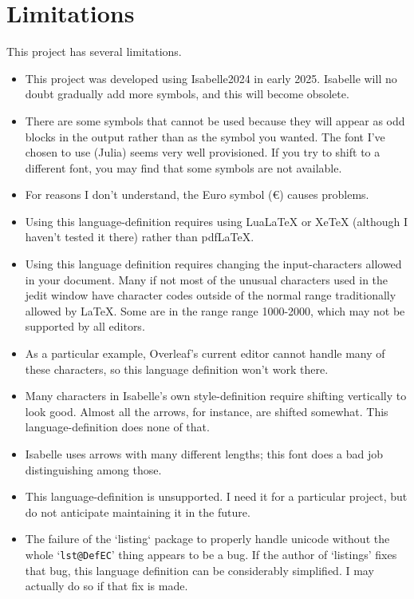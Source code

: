 \documentclass[11pt,notitlepage,openany,oneside]{book}
\begin{document}
\section{Limitations}
This project has several limitations.
\begin{itemize}
    
\item  This project was developed using Isabelle2024 in early 2025. Isabelle 
 will no doubt gradually add more symbols, and this will become obsolete. 

\item There are some symbols that cannot be used because they will appear as 
odd blocks in the output rather than as the symbol you wanted. The font I've 
chosen to use (Julia) seems very well provisioned. If you try to shift to 
a different font, you may find that some symbols are not available. 

\item For reasons I don't understand, the Euro symbol (€) causes problems.

\item Using this language-definition requires using LuaLaTeX or XeTeX (although 
I haven't tested it there) rather than pdfLaTeX.

\item Using this language definition requires changing the input-characters 
allowed in your document. Many if not most of the unusual characters used in the jedit 
window have character codes outside of the normal range traditionally allowed by LaTeX. Some
are in the range range 1000-2000, which may not be supported by all editors.

\item As a particular example, Overleaf's current editor cannot handle many 
of these characters, so this language definition won't work there.

\item Many characters in Isabelle's own style-definition require shifting 
vertically to look good. Almost all the arrows, for instance, are shifted 
somewhat. This language-definition does none of that.

\item Isabelle uses arrows with many different lengths; this font does a 
bad job distinguishing among those. 

\item This language-definition is unsupported. I need it for a particular
project, but do not anticipate maintaining it in the future.

\item The failure of the `listing` package to properly handle unicode without
the whole `\verb|lst@DefEC|' thing appears to be a bug. If the author of
`listings' fixes that bug, this language definition can be considerably 
simplified. I may actually do so if that fix is made. 

\end{itemize}
\end{document}
